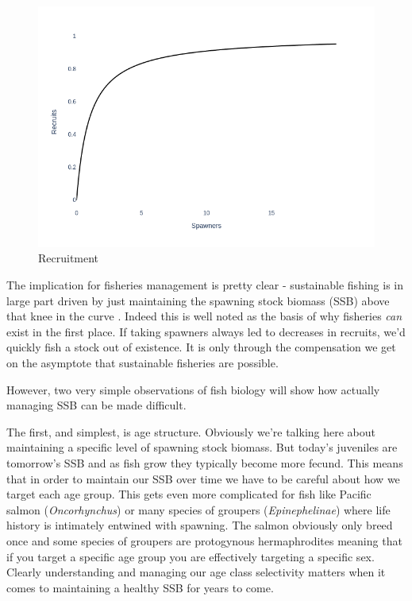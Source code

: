 \documentclass[11pt]{article}
\begin{document}
\begin{figure}[h!] 
  \includegraphics[width=\linewidth]{recruitment.png}
  \caption{Recruitment}
  \label{fig:recruitment}
\end{figure}



The implication for fisheries management is pretty clear - sustainable fishing is in large part driven by just maintaining the spawning stock biomass (SSB) above that knee in the curve \citep{waltersmartell} \citep{king}. Indeed this is well noted as the basis of why fisheries \textit{can} exist in the first place. If taking spawners always led to decreases in recruits, we'd quickly fish a stock out of existence. It is only through the compensation we get on the asymptote that sustainable fisheries are possible. \newline

However, two very simple observations of fish biology will show how actually managing SSB can be made difficult.

The first, and simplest, is age structure. Obviously we're talking here about maintaining a specific level of spawning stock biomass. But today's juveniles are tomorrow's SSB and as fish grow they typically become more fecund. This means that in order to maintain our SSB over time we have to be careful about how we target each age group. This gets even more complicated for fish like Pacific salmon (\textit{Oncorhynchus}) or many species of groupers (\textit{Epinephelinae}) where life history is intimately entwined with spawning. The salmon obviously only breed once \citep{NOAA24} and some species of groupers are protogynous hermaphrodites \citep{RedGrouper} meaning that if you target a specific age group you are effectively targeting a specific sex. Clearly understanding and managing our age class selectivity matters when it comes to maintaining a healthy SSB for years to come. \newline
\end{document}
